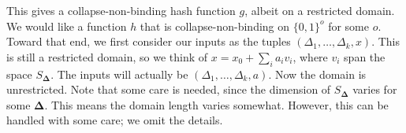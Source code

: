 This gives a collapse-non-binding hash function $g$, albeit on a restricted domain.  We would like a function $h$ that is collapse-non-binding on $\{0,1\}^o$ for some $o$.  Toward that end, we first consider our inputs as the tuples $(\Delta_1,\dots,\Delta_k,x)$.  This is still a restricted domain, so we think of $x=x_0+\sum_i a_i v_i$, where $v_i$ span the space $S_\mathbf{\Delta}$.  The inputs will actually be $(\Delta_1,\dots,\Delta_k,a)$.  Now the domain is unrestricted.  Note that some care is needed, since the dimension of $S_\mathbf{\Delta}$ varies for some $\mathbf{\Delta}$.  This means the domain length varies somewhat.  However, this can be handled with some care; we omit the details.




